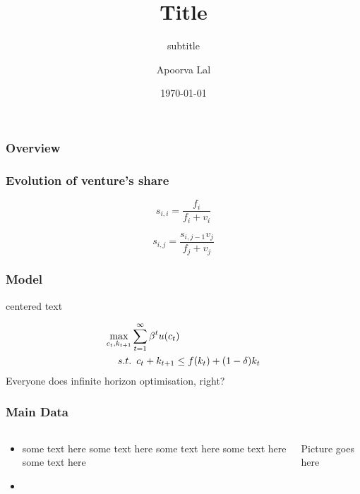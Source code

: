 \documentclass[12pt, aspectratio=169]{beamer}
\begin{document}



\title{Title}
\subtitle{subtitle}

\author{Apoorva Lal}

\date{\today}

\frame{\titlepage}
\begin{frame}
\frametitle{Overview}
\tableofcontents
\end{frame}



\begin{frame}
\frametitle{Evolution of venture's share}

$$
s_{i,i}=\frac{f_i}{f_i+v_i}
$$

$$
s_{i,j}=\frac{s_{i,j-1}v_j}{f_j+v_j}
$$

\end{frame}


\begin{frame}[t]\frametitle{Model}

\begin{center}
centered text
\end{center}

\begin{align*}
\maxi_{c_t,k_{t+1}} &  \sum_{t=1}^{\infty} \beta^t u(c_t)  \\
  s.t. & \enspace c_{t} + k_{t+1} \leq f(k_t) + (1-\delta)k_t
\end{align*}
Everyone does infinite horizon optimisation, right?
\end{frame}

\begin{frame}[label=data_slide]\frametitle{Main Data}

\begin{columns}
\begin{column}{0.6\textwidth}
\begin{itemize}
   \item some text here some text here some text here some text here some text here
   \item \hyperlink{appendix_end}{}
\end{itemize}
\end{column}
\begin{column}{0.4\textwidth}
    \begin{center}
    Picture goes here
     \end{center}
\end{column}
\end{columns}

\end{frame}
\end{document}
